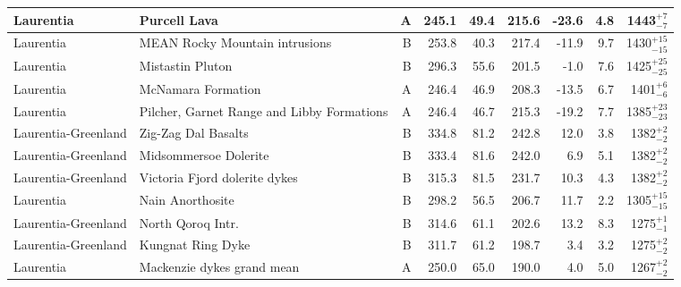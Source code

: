 \begin{longtable}{p{1 in}p{1 in}rrrrrrr}
                     Laurentia &                                       Purcell Lava &      A &     245.1 &      49.4 & 215.6 & -23.6 &       4.8 &     1443$^{+7}_{-7}$ \\ \hline
                     Laurentia &                     MEAN Rocky Mountain intrusions &      B &     253.8 &      40.3 & 217.4 & -11.9 &       9.7 &   1430$^{+15}_{-15}$ \\ \hline
                     Laurentia &                                   Mistastin Pluton &      B &     296.3 &      55.6 & 201.5 &  -1.0 &       7.6 &   1425$^{+25}_{-25}$ \\ \hline
                     Laurentia &                                 McNamara Formation &      A &     246.4 &      46.9 & 208.3 & -13.5 &       6.7 &     1401$^{+6}_{-6}$ \\ \hline
                     Laurentia &         Pilcher, Garnet Range and Libby Formations &      A &     246.4 &      46.7 & 215.3 & -19.2 &       7.7 &   1385$^{+23}_{-23}$ \\ \hline
           Laurentia-Greenland &                                Zig-Zag Dal Basalts &      B &     334.8 &      81.2 & 242.8 &  12.0 &       3.8 &     1382$^{+2}_{-2}$ \\ \hline
           Laurentia-Greenland &                              Midsommersoe Dolerite &      B &     333.4 &      81.6 & 242.0 &   6.9 &       5.1 &     1382$^{+2}_{-2}$ \\ \hline
           Laurentia-Greenland &                      Victoria Fjord dolerite dykes &      B &     315.3 &      81.5 & 231.7 &  10.3 &       4.3 &     1382$^{+2}_{-2}$ \\ \hline
                     Laurentia &                                   Nain Anorthosite &      B &     298.2 &      56.5 & 206.7 &  11.7 &       2.2 &   1305$^{+15}_{-15}$ \\ \hline
           Laurentia-Greenland &                                  North Qoroq Intr. &      B &     314.6 &      61.1 & 202.6 &  13.2 &       8.3 &     1275$^{+1}_{-1}$ \\ \hline
           Laurentia-Greenland &                                  Kungnat Ring Dyke &      B &     311.7 &      61.2 & 198.7 &   3.4 &       3.2 &     1275$^{+2}_{-2}$ \\ \hline
                     Laurentia &                         Mackenzie dykes grand mean &      A &     250.0 &      65.0 & 190.0 &   4.0 &       5.0 &     1267$^{+2}_{-2}$ \\ \hline

\end{longtable}
